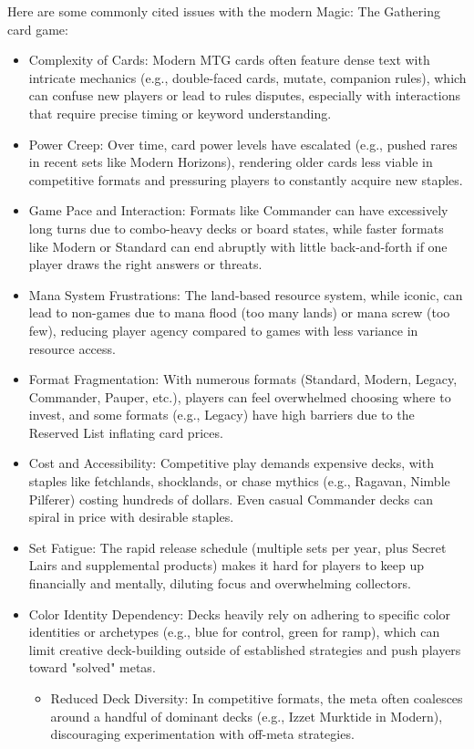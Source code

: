 Here are some commonly cited issues with the modern Magic: The Gathering card game:

\begin{itemize}
\item Complexity of Cards: Modern MTG cards often feature dense text with intricate mechanics (e.g., double-faced cards, mutate, companion rules), which can confuse new players or lead to rules disputes, especially with interactions that require precise timing or keyword understanding.
\item Power Creep: Over time, card power levels have escalated (e.g., pushed rares in recent sets like Modern Horizons), rendering older cards less viable in competitive formats and pressuring players to constantly acquire new staples.
\item Game Pace and Interaction: Formats like Commander can have excessively long turns due to combo-heavy decks or board states, while faster formats like Modern or Standard can end abruptly with little back-and-forth if one player draws the right answers or threats.
\item Mana System Frustrations: The land-based resource system, while iconic, can lead to non-games due to mana flood (too many lands) or mana screw (too few), reducing player agency compared to games with less variance in resource access.
\item Format Fragmentation: With numerous formats (Standard, Modern, Legacy, Commander, Pauper, etc.), players can feel overwhelmed choosing where to invest, and some formats (e.g., Legacy) have high barriers due to the Reserved List inflating card prices.
\item Cost and Accessibility: Competitive play demands expensive decks, with staples like fetchlands, shocklands, or chase mythics (e.g., Ragavan, Nimble Pilferer) costing hundreds of dollars. Even casual Commander decks can spiral in price with desirable staples.
\item Set Fatigue: The rapid release schedule (multiple sets per year, plus Secret Lairs and supplemental products) makes it hard for players to keep up financially and mentally, diluting focus and overwhelming collectors.
\item Color Identity Dependency: Decks heavily rely on adhering to specific color identities or archetypes (e.g., blue for control, green for ramp), which can limit creative deck-building outside of established strategies and push players toward "solved" metas.
	\begin{itemize}
		\item Reduced Deck Diversity: In competitive formats, the meta often coalesces around a handful of dominant decks (e.g., Izzet Murktide in Modern), discouraging experimentation with off-meta strategies.

\end{itemize}
\end{itemize}
